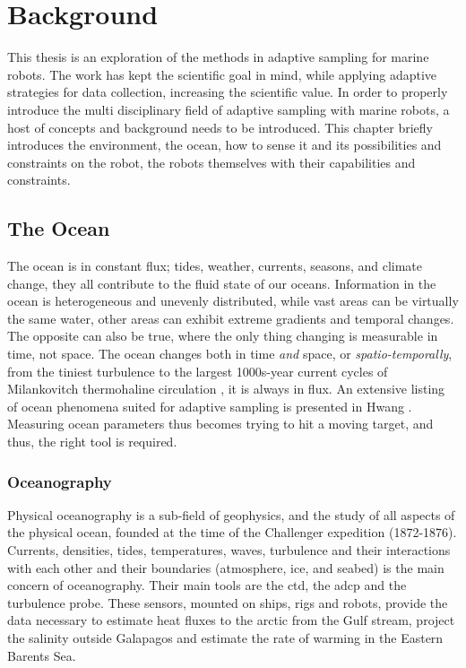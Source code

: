 \chapter{Background}


This thesis is an exploration of the methods in adaptive sampling for marine robots. The work has kept the scientific goal in mind, while applying adaptive strategies for data collection, increasing the scientific value. In order to properly introduce the multi disciplinary field of adaptive sampling with marine robots, a host of concepts and background needs to be introduced. This chapter briefly introduces the environment, the ocean, how to sense it and its possibilities and constraints on the robot, the robots themselves with their capabilities and constraints.


\section{The Ocean}
The ocean is in constant flux; tides, weather, currents, seasons, and climate change, they all contribute to the fluid state of our oceans. Information in the ocean is heterogeneous and unevenly distributed, while vast areas can be virtually the same water, other areas can exhibit extreme gradients and temporal changes. The opposite can also be true, where the only thing changing is measurable in time, not space. The ocean changes both in time \textit{and} space, or \textit{spatio-temporally}, from the tiniest turbulence to the largest 1000s-year current cycles of Milankovitch thermohaline circulation \cite{talley2011descriptive}, it is always in flux. An extensive listing of ocean phenomena suited for adaptive sampling is presented in Hwang \cite{hwang2019auv}. Measuring ocean parameters thus becomes trying to hit a moving target, and thus, the right tool is required.

\subsection*{Oceanography}
Physical oceanography is a sub-field of geophysics, and the study of all aspects of the physical ocean, founded at the time of the Challenger expedition \cite{thomson1873challenger} (1872-1876). Currents, densities, tides, temperatures, waves, turbulence and their interactions with each other and their boundaries (atmosphere, ice, and seabed) is the main concern of oceanography. Their main tools are the \acrfull{ctd}, the \acrfull{adcp} and the turbulence probe. These sensors, mounted on ships, rigs and robots, provide the data necessary to estimate heat fluxes to the arctic from the Gulf stream, project the salinity outside Galapagos and estimate the rate of warming in the Eastern Barents Sea.  

